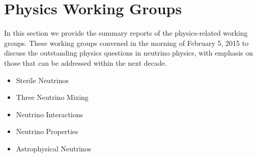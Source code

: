 \section{Physics Working Groups}
\label{sec:Physics WG}

In this section we provide the summary reports of the physics-related
working groups.  These working groups convened in the morning of
February 5, 2015 to discuss the outstanding physics questions in neutrino
physics, with emphasis on those that can be addressed within the next
decade.

\begin{itemize}
  \item Sterile Neutrinos
  \item Three Neutrino Mixing
  \item Neutrino Interactions
  \item Neutrino Properties
  \item Astrophysical Neutrinos
\end{itemize}
